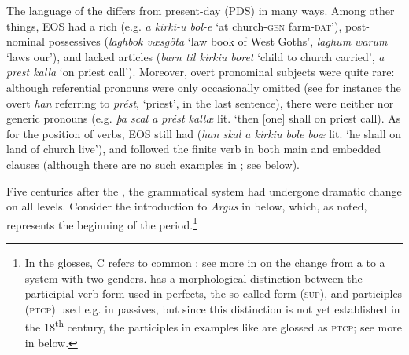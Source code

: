 \documentclass[output=paper]{langscibook}
\begin{document}
The language of the   differs from present-day  (PDS) in many ways. Among other things, EOS had a rich  (e.g. \textit{a kirki-u bol-e} ‘at church-\textsc{gen} farm-\textsc{dat’}), post-nominal possessives (\textit{laghbok væsgöta} ‘law book of West Goths’, \textit{laghum warum} ‘laws our’), and lacked  articles (\textit{barn til kirkiu boret} ‘child to church carried’, \textit{a prest kalla} ‘on priest call’). Moreover, overt pronominal subjects were quite rare: although referential pronouns were only occasionally omitted (see for instance the overt \textit{han} referring to \textit{prést}, ‘priest’, in the last sentence), there were neither  nor generic pronouns (e.g. \textit{þa scal a prést kallæ} lit. ‘then [one] shall on priest call). As for the position of verbs, EOS still had  (\textit{han skal a kirkiu bole boæ} lit. ‘he shall on land of church live’), and  followed the finite verb in both main and embedded clauses (although there are no such examples in ; see  below).



Five centuries after the , the grammatical system had undergone dramatic change on all levels. Consider the introduction to \textit{Argus} in  below, which, as noted, represents the beginning of the  period.\footnote{In the glosses, \textsc{C} refers to common ; see more in  on the change from a  to a system with two genders.  has a morphological distinction between the participial verb form used in perfects, the so-called  form (\textsc{sup}), and  participles (\textsc{ptcp)} used e.g. in passives, but since this distinction is not yet established in the 18\textsuperscript{th} century, the participles in examples like  are glossed as \textsc{ptcp}; see more in  below.}
\end{document}
